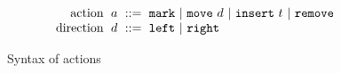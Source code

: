 \begin{figure}
  \vspace{-3px}
  \[
  \arraycolsep=3pt\begin{array}{rlrl}
      \text{action} & \action & ::= &
        \actionlit{mark} ~\vert~
        \actionlit{move}~\direction ~\vert~
        \actionlit{insert}~\tile ~\vert~
        \actionlit{remove} \\
      \text{direction} & \direction & ::= &
        \texttt{left} ~\vert~
        \texttt{right}
  \end{array}\]
  \caption{Syntax of actions}
  \label{fig:action-syntax}
\end{figure}
